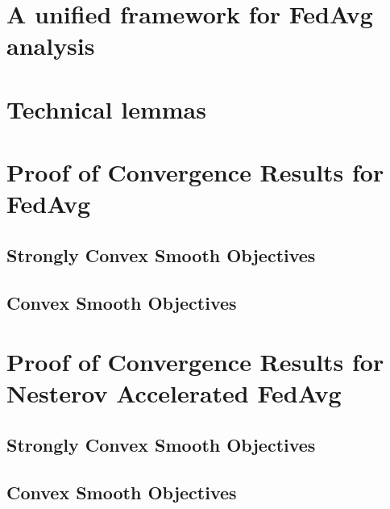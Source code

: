 


\section{A unified framework for FedAvg analysis}


\section{Technical lemmas}



\section{Proof of Convergence Results for FedAvg}
\label{sec:app:fedavg}

\subsection{Strongly Convex Smooth Objectives}


\subsection{Convex Smooth Objectives}
\label{sec:nasgdscvxsmth}
%


\section{Proof of Convergence Results for Nesterov Accelerated FedAvg}
\label{sec:app:Nesterovfedavg}
\subsection{Strongly Convex Smooth Objectives}
\label{sec:convexsmoothsgd}
%


\subsection{Convex Smooth Objectives}
\label{sec:nasgdcvxsmth}
%




